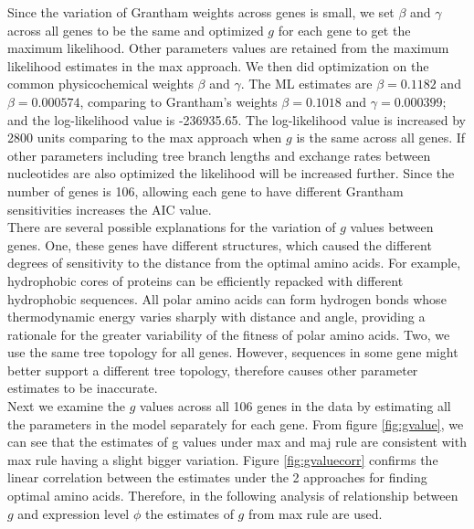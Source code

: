 Since the variation of Grantham weights across genes is small, we set $\beta$ and $\gamma$ across all genes to be the same and optimized $g$ for each gene to get the maximum likelihood. 
Other parameters values are retained from the maximum likelihood estimates in the max approach.
We then did optimization on the common physicochemical weights $\beta$ and $\gamma$.
The ML estimates are $\beta = 0.1182$ and $\beta = 0.000574$, comparing to Grantham's weights $\beta = 0.1018$ and $\gamma = 0.000399$; and the log-likelihood value is -236935.65. 
The log-likelihood value is increased by 2800 units comparing to the max approach when $g$ is the same across all genes. 
If other parameters including tree branch lengths and exchange rates between nucleotides are also optimized the likelihood will be increased further.
Since the number of genes is 106, allowing each gene to have different Grantham sensitivities increases the AIC value. \\

There are several possible explanations for the variation of $g$ values between genes. 
One, these genes have different structures, which caused the different degrees of sensitivity to the distance from the optimal amino acids. 
For example, hydrophobic cores of proteins can be efficiently repacked with different hydrophobic sequences. All polar amino acids can form hydrogen bonds whose thermodynamic energy varies sharply with distance and angle, providing a rationale for the greater variability of the fitness of polar amino acids.
Two, we use the same tree topology for all genes. However, sequences in some gene might better support a different  tree topology, therefore causes other parameter estimates to be inaccurate.\\

Next we examine the $g$ values across all 106 genes in the data by estimating all the parameters in the model separately for each gene. 
From figure \ref{fig:gvalue}, we can see that the estimates of g values under max and maj rule are consistent with max rule having a slight bigger variation. 
Figure \ref{fig:gvaluecorr} confirms the linear correlation between the estimates under the 2 approaches for finding optimal amino acids. 
Therefore, in the following analysis of relationship between $g$ and expression level $\phi$ the estimates of $g$ from max rule are used. 

